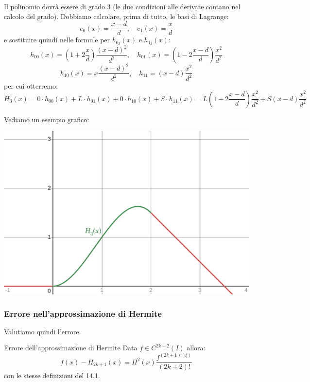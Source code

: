 \documentclass[a4paper,11pt]{article}
\begin{document}
Il polinomio dovrà essere di grado 3 (le due condizioni alle derivate contano nel calcolo del grado).
Dobbiamo calcolare, prima di tutto, le basi di Lagrange:
$$
e_0(x) = \frac{x - d}{d}, \quad e_1(x) = \frac{x}{d}
$$
e sostituire quindi nelle formule per $h_{0j}(x)$ e $h_{1j}(x)$:
$$
h_{00}(x) = \left( 1 + 2\frac{x}{d} \right) \frac{(x - d)^2}{d^2}, \quad h_{01}(x) = \left( 1 - 2 \frac{x - d}{d} \right) \frac{x^2}{d^2}
$$
$$
h_{10}(x) = x \frac{(x - d)^2}{d^2}, \quad h_{11} = (x - d) \frac{x^2}{d^2}
$$
per cui otterremo:
$$
H_3(x) = 0 \cdot h_{00}(x) + L \cdot h_{01}(x) + 0 \cdot h_{10}(x) + S \cdot h_{11}(x) = L \left( 1 - 2 \frac{x - d}{d} \right) \frac{x^2}{d^2} + S (x - d) \frac{x^2}{d^2}
$$

\par\medskip
\noindent

\begin{minipage}{\textwidth}
Vediamo un esempio grafico:
\begin{center}
	\includegraphics[scale=0.28]{../figures/tracks.png}
\end{center}
\end{minipage}

\par\medskip

\subsubsection{Errore nell'approssimazione di Hermite}
Valutiamo quindi l'errore:
\begin{theorem}{Errore dell'approssimazione di Hermite}
	Data $f \in C^{2k + 2}(I)$ allora:
$$
f(x) - H_{2k + 1}(x) = \Pi^2 (x) \frac{f^{(2k + 1)(\xi)}}{(2k + 2)!}
$$
con le stesse definizioni del 14.1.
\end{theorem}
\end{document}

